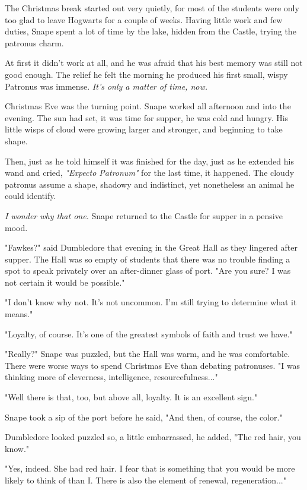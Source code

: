 \documentclass[a4paper,11pt]{article}
\begin{document}
The Christmas break started out very quietly, for most of the students were only too glad to leave Hogwarts for a couple of weeks. Having little work and few duties, Snape spent a lot of time by the lake, hidden from the Castle, trying the patronus charm.

At first it didn't work at all, and he was afraid that his best memory was still not good enough. The relief he felt the morning he produced his first small, wispy Patronus was immense. \emph{It's only a matter of time, now.}

Christmas Eve was the turning point. Snape worked all afternoon and into the evening. The sun had set, it was time for supper, he was cold and hungry. His little wisps of cloud were growing larger and stronger, and beginning to take shape.

Then, just as he told himself it was finished for the day, just as he extended his wand and cried, \emph{"Expecto Patronum"} for the last time, it happened. The cloudy patronus assume a shape, shadowy and indistinct, yet nonetheless an animal he could identify.

\emph{I wonder why that one.} Snape returned to the Castle for supper in a pensive mood.

"Fawkes?" said Dumbledore that evening in the Great Hall as they lingered after supper. The Hall was so empty of students that there was no trouble finding a spot to speak privately over an after-dinner glass of port. "Are you sure? I was not certain it would be possible."

"I don't know why not. It's not uncommon. I'm still trying to determine what it means."

"Loyalty, of course. It's one of the greatest symbols of faith and trust we have."

"Really?" Snape was puzzled, but the Hall was warm, and he was comfortable. There were worse ways to spend Christmas Eve than debating patronuses. "I was thinking more of cleverness, intelligence, resourcefulness..."

"Well there is that, too, but above all, loyalty. It is an excellent sign."

Snape took a sip of the port before he said, "And then, of course, the color."

Dumbledore looked puzzled so, a little embarrassed, he added, "The red hair, you know."

"Yes, indeed. She had red hair. I fear that is something that you would be more likely to think of than I. There is also the element of renewal, regeneration..."
\end{document}
